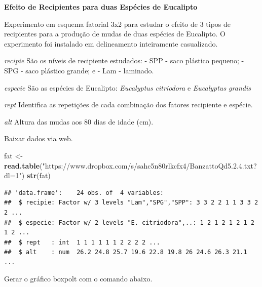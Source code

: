 \documentclass[]{book}
\newenvironment{Shaded}{\begin{snugshade}}{\end{snugshade}}
\newcommand{\DataTypeTok}[1]{\textcolor[rgb]{0.13,0.29,0.53}{#1}}
\newcommand{\KeywordTok}[1]{\textcolor[rgb]{0.13,0.29,0.53}{\textbf{#1}}}
\newcommand{\NormalTok}[1]{#1}
\newcommand{\OperatorTok}[1]{\textcolor[rgb]{0.81,0.36,0.00}{\textbf{#1}}}
\newcommand{\StringTok}[1]{\textcolor[rgb]{0.31,0.60,0.02}{#1}}
\begin{document}
\textbf{Efeito de Recipientes para duas Espécies de Eucalipto}

Experimento em esquema fatorial 3x2 para estudar o efeito de 3 tipos de recipientes para a produção de mudas de duas espécies de Eucalipto. O experimento foi instalado em delineamento inteiramente casualizado.

\emph{recipie}
São os níveis de recipiente estudados:
- SPP - saco plástico pequeno;
- SPG - saco plástico grande; e
- Lam - laminado.

\emph{especie}
São as espécies de Eucalipto: \emph{Eucalyptus citriodora} e \emph{Eucalyptus grandis}

\emph{rept}
Identifica as repetições de cada combinação dos fatores recipiente e espécie.

\emph{alt}
Altura das mudas aos 80 dias de idade (cm).

Baixar dados via web.

\begin{Shaded}
\begin{Highlighting}[]
\NormalTok{fat <-}\StringTok{ }\KeywordTok{read.table}\NormalTok{(}\StringTok{"https://www.dropbox.com/s/sahc5n80rlkcfx4/BanzattoQd5.2.4.txt?dl=1"}\NormalTok{)}
\KeywordTok{str}\NormalTok{(fat)}
\end{Highlighting}
\end{Shaded}

\begin{verbatim}
## 'data.frame':    24 obs. of  4 variables:
##  $ recipie: Factor w/ 3 levels "Lam","SPG","SPP": 3 3 2 2 1 1 3 3 2 2 ...
##  $ especie: Factor w/ 2 levels "E. citriodora",..: 1 2 1 2 1 2 1 2 1 2 ...
##  $ rept   : int  1 1 1 1 1 1 2 2 2 2 ...
##  $ alt    : num  26.2 24.8 25.7 19.6 22.8 19.8 26 24.6 26.3 21.1 ...
\end{verbatim}

Gerar o gráfico boxpolt com o comando abaixo.

\begin{Shaded}
\end{Shaded}
\end{document}
